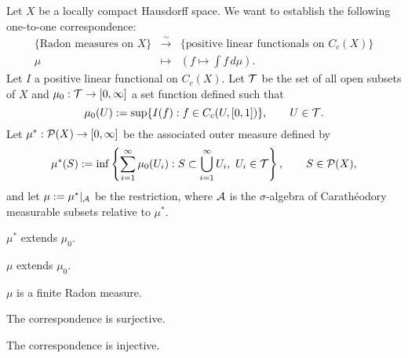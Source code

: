 \documentclass{../../large}
\begin{document}
\begin{prb}
Let $X$ be a locally compact Hausdorff space.
We want to establish the following one-to-one correspondence:
\[\begin{array}{ccc}
\{\text{Radon measures on $X$}\} & \xrightarrow{\sim} & \{\text{positive linear functionals on $C_c(X)$}\}\\
\mu & \mapsto & (f\mapsto\int f\,d\mu).
\end{array}\]
Let $I$ a positive linear functional on $C_c(X)$.
Let $\mathcal{T}$ be the set of all open subsets of $X$ and $\mu_0:\mathcal{T}\to[0,\infty]$ a set function defined such that
\[\mu_0(U):=\sup\{I(f):f\in C_c(U,[0,1])\},\qquad U\in\mathcal{T}.\]
Let $\mu^*:\mathcal{P}(X)\to[0,\infty]$ be the associated outer measure defined by
\[\mu^*(S):=\inf\left\{\sum_{i=1}^\infty\mu_0(U_i):S\subset\bigcup_{i=1}^\infty U_i,\ U_i\in\mathcal{T}\right\},\qquad S\in\mathcal{P}(X),\]
and let $\mu:=\mu^*|_{\mathcal{A}}$ be the restriction, where $\mathcal{A}$ is the $\sigma$-algebra of Carath\'eodory measurable subsets relative to $\mu^*$.
\begin{parts}
\item $\mu^*$ extends $\mu_0$.
\item $\mu$ extends $\mu_0$.
\item $\mu$ is a finite Radon measure.
\item The correspondence is surjective.
\item The correspondence is injective.
\end{parts}
\end{prb}
\end{document}
